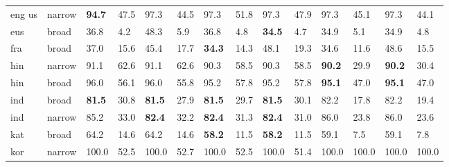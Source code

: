 \begin{center}
{\begin{tabularx}{1.3\textwidth}{|Xl||ll||ll||ll||ll||ll||ll|}
eng us             & narrow        & \textbf{94.7}      & 47.5             & 97.3               & 44.5              & 97.3                & 51.8              & 97.3                & 47.9               & 97.3              & 45.1             & 97.3               & 44.1             \\
eus                & broad         & 36.8               & 4.2              & 48.3               & 5.9               & 36.8                & 4.8               & \textbf{34.5}       & 4.7                & 34.9              & 5.1              & 34.9               & 4.8              \\
fra                & broad         & 37.0               & 15.6             & 45.4               & 17.7              & \textbf{34.3}       & 14.3              & 48.1                & 19.3               & 34.6              & 11.6             & 48.6               & 15.5             \\
hin                & narrow        & 91.1               & 62.6             & 91.1               & 62.6              & 90.3                & 58.5              & 90.3                & 58.5               & \textbf{90.2}     & 29.9             & \textbf{90.2}      & 30.4             \\
hin                & broad         & 96.0               & 56.1             & 96.0               & 55.8              & 95.2                & 57.8              & 95.2                & 57.8               & \textbf{95.1}     & 47.0             & \textbf{95.1}      & 47.0             \\
ind                & broad         & \textbf{81.5}      & 30.8             & \textbf{81.5}      & 27.9              & \textbf{81.5}       & 29.7              & \textbf{81.5}       & 30.1               & 82.2              & 17.8             & 82.2               & 19.4             \\
ind                & narrow        & 85.2               & 33.0             & \textbf{82.4}      & 32.2              & \textbf{82.4}       & 31.3              & \textbf{82.4}       & 31.0               & 86.0              & 23.8             & 86.0               & 23.6             \\
kat                & broad         & 64.2               & 14.6             & 64.2               & 14.6              & \textbf{58.2}       & 11.5              & \textbf{58.2}       & 11.5               & 59.1              & 7.5              & 59.1               & 7.8              \\
kor                & narrow        & 100.0              & 52.5             & 100.0              & 52.7              & 100.0               & 52.5              & 100.0               & 51.4               & 100.0             & 100.0            & 100.0              & 100.0            \\

\end{tabularx}}
\end{center}
